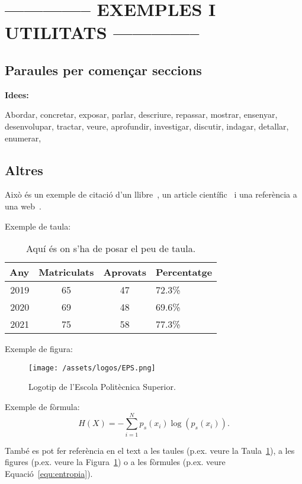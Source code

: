 \documentclass[a4paper,12pt]{ThesisStyle}
\begin{document}
\section{-------------- EXEMPLES I UTILITATS --------------}
\subsection{Paraules per començar seccions}
\textbf{Idees:}

Abordar, concretar, exposar, parlar, descriure, repassar, mostrar, ensenyar, desenvolupar, tractar, veure, aprofundir, investigar, discutir, indagar, detallar,
enumerar,


\subsection{Altres}

Això és un exemple de citació d'un llibre~\cite{Coleman1974}, un article científic~\cite{Ruiz2008} i una referència a una web~\cite{Halcon}.

Exemple de taula:
\begin{table}[htb]
\centering
\begin{tabular}{ | r | c | c | l | }
 \hline
  Any & Matriculats & Aprovats & Percentatge\\
\hline
 2019  & 65 & 47 & 72.3\%\\
 2020  & 69 & 48 & 69.6\%\\
 2021  & 75 & 58 & 77.3\%\\
  \hline
  \end{tabular}
\caption{\label{taula:taulaexemple} Aquí és on s'ha de posar el peu de taula. }
\end{table}

Exemple de figura:
\begin{figure}[htb]
\centering
\texttt{[image: /assets/logos/EPS.png]}
\caption{\label{fig:logo} Logotip de l'Escola Politècnica Superior.}
\end{figure}

Exemple de fòrmula:
\begin{equation}
H(X) = -\sum_{i=1}^{N}p_s(x_i) \log \left( p_s(x_i) \right).
\label{equ:entropia}
\end{equation}


També es pot fer referència en el text a les taules (p.ex. veure la Taula~\ref{taula:taulaexemple}), a les figures (p.ex. veure la Figura~\ref{fig:logo}) o a les fòrmules (p.ex. veure Equació~\ref{equ:entropia}).
\end{document}
